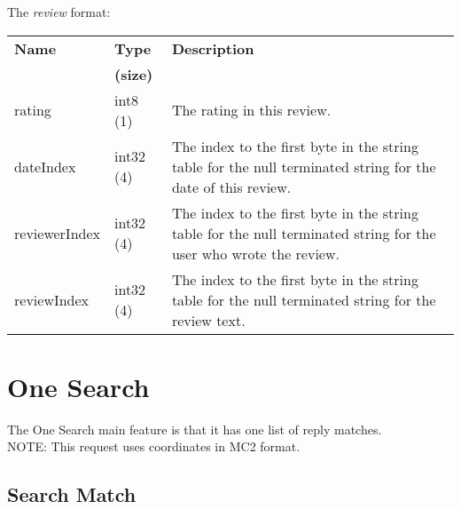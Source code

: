 \documentclass[a4paper]{article}
\begin{document}
The \emph{review} format:\\
\begin{tabular}{|l|l|p{60mm}|}
  \hline
  \textbf{Name} & \textbf{Type} & \textbf{Description} \\
                & \textbf{(size)} & \\\hline
    rating    & int8 (1)  & The rating in this review.                   \\\hline
    dateIndex      & int32 (4) & The index to the first byte in the string table for 
the null terminated string for the date of this review.              \\\hline
    reviewerIndex  & int32 (4) & The index to the first byte in the string table for 
the null terminated string for the user who wrote the review.                \\\hline
    reviewIndex    & int32 (4)  & The index to the first byte in the string table for 
the null terminated string for the review text.                         \\\hline

\end{tabular}

\section{One Search}

The One Search main feature is that it has one list of reply matches.\\
NOTE: This request uses coordinates in MC2 format.

\subsection{Search Match}
\label{SearchMatch}
\end{document}

